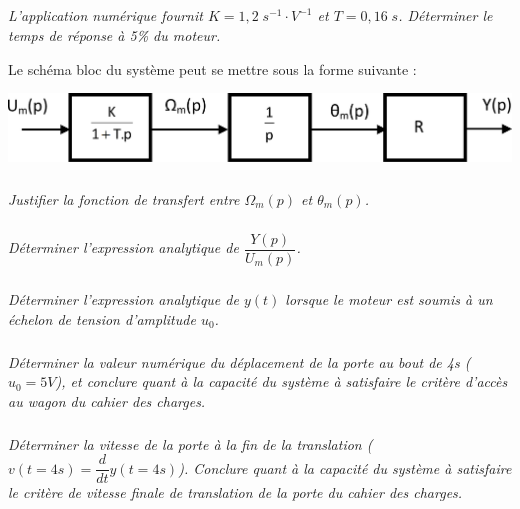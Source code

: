 \documentclass[10pt]{article}
\begin{document}
\subparagraph{}
\textit{L'application numérique fournit $K=1,2 \; s^{-1}\cdot V^{-1}$ et $T=0,16\;s$. Déterminer le temps de réponse à 5\% du moteur.}

 Le schéma bloc du système peut se mettre sous la forme suivante :

 \begin{center}
\includegraphics[width=.5\textwidth]{images/fig_04}
\end{center} 

\subparagraph{}
\textit{Justifier la fonction de transfert entre $\Omega_m(p)$ et $\theta_m (p)$.}  

\subparagraph{}
\textit{Déterminer l'expression analytique de $\dfrac{Y(p)}{U_m(p)}$.}

\subparagraph{}
\textit{Déterminer l'expression analytique de $y(t)$ lorsque le moteur est soumis à un échelon de tension d'amplitude $u_0$.}  

\subparagraph{}
\textit{Déterminer la valeur numérique du déplacement de la porte au bout de 4s ($u_0 =5V$), et conclure quant à la capacité du système à satisfaire le critère d'accès au wagon du cahier des charges.}

\subparagraph{}
\textit{Déterminer la vitesse de la porte à la fin de la translation ($v(t=4s)= \dfrac{d}{dt}y(t=4s)$). Conclure quant à la capacité du système à satisfaire le critère de vitesse finale de translation de la porte du cahier des charges. }
\end{document}
